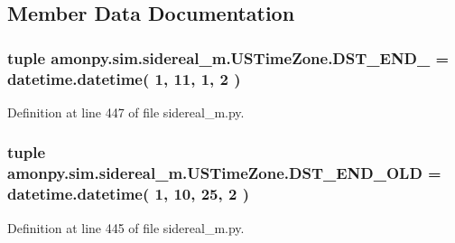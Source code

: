 \subsection{Member Data Documentation}
\hypertarget{classamonpy_1_1sim_1_1sidereal__m_1_1_u_s_time_zone_a3aebe85ce10342323455d00f174ec2e5}{
\subsubsection[{D\-S\-T\-\_\-\-E\-N\-D\-\_\-2007}]{\setlength{\rightskip}{0pt plus 5cm}tuple amonpy.\-sim.\-sidereal\-\_\-m.\-U\-S\-Time\-Zone.\-D\-S\-T\-\_\-\-E\-N\-D\-\_ = datetime.\-datetime( 1, 11, 1, 2 )\hspace{0.3cm}{\ttfamily [static]}}}\label{classamonpy_1_1sim_1_1sidereal__m_1_1_u_s_time_zone_a3aebe85ce10342323455d00f174ec2e5}


Definition at line 447 of file sidereal\-\_\-m.\-py.

\hypertarget{classamonpy_1_1sim_1_1sidereal__m_1_1_u_s_time_zone_a6b3c892f985cb258686c386b1f2adee1}{
\subsubsection[{D\-S\-T\-\_\-\-E\-N\-D\-\_\-\-O\-L\-D}]{\setlength{\rightskip}{0pt plus 5cm}tuple amonpy.\-sim.\-sidereal\-\_\-m.\-U\-S\-Time\-Zone.\-D\-S\-T\-\_\-\-E\-N\-D\-\_\-\-O\-L\-D = datetime.\-datetime( 1, 10, 25, 2 )\hspace{0.3cm}{\ttfamily [static]}}}\label{classamonpy_1_1sim_1_1sidereal__m_1_1_u_s_time_zone_a6b3c892f985cb258686c386b1f2adee1}


Definition at line 445 of file sidereal\-\_\-m.\-py.

